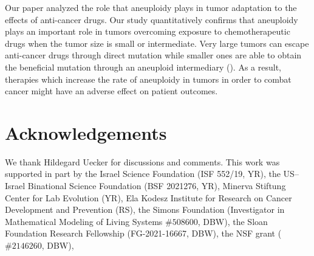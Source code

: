 \documentclass[12pt]{extarticle}
\begin{document}
Our paper analyzed the role that aneuploidy plays in tumor adaptation to the effects of anti-cancer drugs. Our study quantitatively confirms that aneuploidy plays an important role in tumors overcoming exposure to chemotherapeutic drugs when the tumor size is small or intermediate. Very large tumors can escape anti-cancer drugs through direct mutation while smaller ones are able to obtain the beneficial mutation through an aneuploid intermediary (). As a result, therapies which increase the rate of aneuploidy in tumors in order to combat cancer might have an adverse effect on patient outcomes.

{\small
\section*{Acknowledgements}
We thank Hildegard Uecker for discussions and comments. 
This work was supported in part by
the Israel Science Foundation (ISF 552/19, YR),
the US–Israel Binational Science Foundation (BSF 2021276, YR), 
Minerva Stiftung Center for Lab Evolution (YR), 
Ela Kodesz Institute for Research on Cancer Development and Prevention (RS),
the Simons Foundation (Investigator in Mathematical Modeling of Living Systems $\#508600$, DBW),
the Sloan Foundation Research Fellowship (FG-2021-16667, DBW),
the NSF grant ($\#2146260$, DBW),
}
\end{document}
